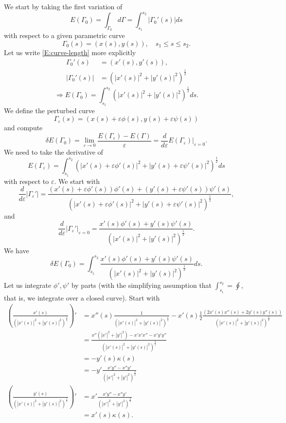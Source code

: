 \documentclass[10pt,a4paper]{article}
\begin{document}
We start by taking the first variation of
%
\begin{equation}\label{E:curve-length}
E(\Gamma_0) = \int_{\Gamma_0} d\Gamma = \int_{s_1}^{s_2} |\Gamma_0'(s)|ds
\end{equation}
%
with respect to a given parametric curve
\[
\Gamma_0(s) = \left( x(s), y(s) \right), \quad s_1 \leqslant s \leqslant s_2.
\]
Let us write \eqref{E:curve-length} more explicitly
%
\begin{align*}
\Gamma_0'(s)&=\left( x'(s), y'(s) \right), \\
|\Gamma_0'(s)|&=\left( |x'(s)|^2 + |y'(s)|^2 \right)^\frac{1}{2}
\end{align*}
%
\[
\Rightarrow  E(\Gamma_0) = \int_{s_1}^{s_2} \left( |x'(s)|^2 + |y'(s)|^2 \right)^\frac{1}{2} ds.
\]
We define the perturbed curve
\[
\Gamma_\varepsilon(s) = \left( x(s)+\varepsilon \phi(s), y(s) + \varepsilon \psi(s) \right)
\]
and compute
\[
\delta E(\Gamma_0) = \lim_{\varepsilon \rightarrow 0} \frac{E(\Gamma_\varepsilon) - E(\Gamma)}{\varepsilon}
= \frac{d}{d\varepsilon} E(\Gamma_\varepsilon) |_{\varepsilon=0}.
\]
We need to take the derivative of
\[
E(\Gamma_\varepsilon) = \int_{s_1}^{s_2} \left( |x'(s)+\varepsilon \phi'(s)|^2 + |y'(s) + \varepsilon \psi'(s)|^2 \right)^\frac{1}{2} ds
\]
with respect to $\varepsilon$. We start with
%
\begin{equation*}
\frac{d}{d\varepsilon} |\Gamma_\varepsilon'| 
= \frac{(x'(s)+\varepsilon \phi'(s)) \phi'(s) + (y'(s) + \varepsilon \psi'(s))\psi'(s) }{\left( |x'(s)+\varepsilon \phi'(s)|^2 + |y'(s) + \varepsilon \psi'(s)|^2 \right)^{\frac{1}{2}}},
\end{equation*}
%
and
%
\begin{equation*}
\frac{d}{d\varepsilon} |\Gamma_\varepsilon'|_{\varepsilon=0} = \frac{x'(s)\phi'(s) + y'(s)\psi'(s)}{\left( |x'(s)|^2 + |y'(s)|^2 \right)^{\frac{1}{2}}}.
\end{equation*}
%
We have
\[
\delta E(\Gamma_0) = \int_{s_1}^{s_2} \frac{x'(s)\phi'(s) + y'(s)\psi'(s)}{\left( |x'(s)|^2 + |y'(s)|^2 \right)^{\frac{1}{2}}} ds.
\]
Let us integrate $\phi', \psi'$ by parts (with the simplifying assumption that
$ \int_{s_1}^{s_2} = \oint$, that is, we integrate over a closed curve).
Start with
%
\begin{align*}
\left(  \frac{x'(s)}{\left( |x'(s)|^2 + |y'(s)|^2 \right)^{\frac{1}{2}}} \right)'
&=x''(s)\frac{1}{\left( |x'(s)|^2 + |y'(s)|^2 \right)^{\frac{1}{2}}} 
- x'(s)\frac{1}{2}\frac{(2x'(s)x''(s) + 2y'(s)y''(s))}{\left( |x'(s)|^2 + |y'(s)|^2 \right)^{\frac{3}{2}}} \\
&= \frac{x''\left( |x'|^2 + |y'|^2 \right) - x'x'x''-x'y'y''}{\left( |x'(s)|^2 + |y'(s)|^2 \right)^{\frac{3}{2}}} \\
&= -y'(s)\kappa(s) \\
&= -y' \frac{x'y'' - x''y'}{\left( |x'|^2 + |y'|^2 \right)^{\frac{3}{2}}} \\
\left(  \frac{y'(s)}{\left( |x'(s)|^2 + |y'(s)|^2 \right)^{\frac{1}{2}}} \right)' 
&= x' \frac{x'y'' - x''y'}{\left( |x'|^2 + |y'|^2 \right)^{\frac{3}{2}}} \\
&= x'(s)\kappa(s).
\end{align*}
\end{document}

